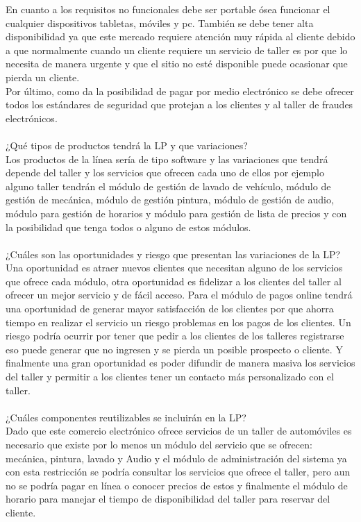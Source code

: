 \documentclass[10pt,a4paper,openany]{book}
\begin{document}
En cuanto a los requisitos no funcionales debe ser portable ósea funcionar el cualquier dispositivos tabletas, móviles y pc. También se debe tener alta disponibilidad ya que este mercado requiere atención muy rápida al cliente debido a que normalmente cuando un cliente requiere un servicio de taller es por que lo necesita de manera urgente y que el sitio no esté disponible puede ocasionar que pierda un cliente.\\
Por último, como da la posibilidad de pagar por medio electrónico se debe ofrecer todos los estándares de seguridad que protejan a los clientes y al taller de fraudes electrónicos.\\\\
 
¿Qué tipos de productos tendrá la LP y que variaciones?\\
Los productos de la línea sería de tipo software y las variaciones que tendrá depende del taller y los servicios que ofrecen cada uno de ellos por ejemplo alguno taller tendrán el módulo de gestión de lavado de vehículo, módulo de gestión de mecánica, módulo de gestión pintura, módulo de gestión de audio, módulo para gestión de horarios y módulo para gestión de lista de precios y con la posibilidad que tenga todos o alguno de estos módulos.\\\\
¿Cuáles son las oportunidades y riesgo que presentan las variaciones de la LP?\\
Una oportunidad es atraer nuevos clientes que necesitan alguno de los servicios que ofrece cada módulo, otra oportunidad es fidelizar a los clientes del taller al ofrecer un mejor servicio y de fácil acceso. Para el módulo de pagos online tendrá una oportunidad de generar mayor satisfacción de los clientes por que ahorra tiempo en realizar el servicio un riesgo problemas en los pagos de los clientes. Un riesgo podría ocurrir por tener que pedir a los clientes de los talleres registrarse eso puede generar que no ingresen y se pierda un posible prospecto o cliente. Y finalmente una gran oportunidad es poder difundir de manera masiva los servicios del taller y permitir a los clientes tener un contacto más personalizado con el taller.\\\\
¿Cuáles componentes reutilizables se incluirán en la LP?\\
Dado que este comercio electrónico ofrece servicios de un taller de automóviles es necesario que existe por lo menos un módulo del servicio que se ofrecen:  mecánica, pintura, lavado y Audio y el módulo de administración del sistema ya con esta restricción se podría consultar los servicios que ofrece el taller, pero aun no se podría pagar en línea o conocer precios de estos y finalmente el módulo de horario para manejar el tiempo de disponibilidad del taller para reservar del cliente.\\\\
\end{document}
